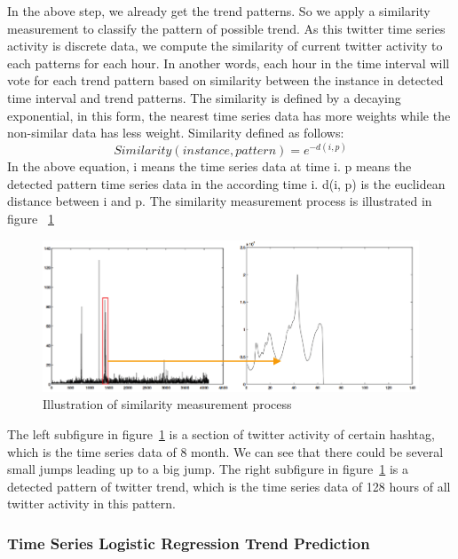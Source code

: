 \documentclass{article}
\begin{document}
In the above step, we already get the trend patterns. So we apply a similarity measurement to classify the pattern of possible trend. As this twitter time series activity is discrete data, we compute the similarity of current twitter activity to each patterns for each hour. In another words, each hour in the time interval will vote for each trend pattern based on similarity between the instance in detected time interval and trend patterns.
The similarity is defined by a decaying exponential, in this form, the nearest time series data has more weights while the non-similar data has less weight. Similarity defined as follows:
\begin{equation} 
Similarity(instance, pattern) = e^{-d(i, p)}
\end{equation}
In the above equation, i means the time series data at time i. p means the detected pattern time series data in the according time i. d(i, p) is the euclidean distance between i and p. The similarity measurement process is illustrated in figure ~\ref{imgcmp}
\begin{figure}[ht]
\vskip 0.2in
\begin{center}
\centerline{\includegraphics[width=\columnwidth]{compare}}
\caption{Illustration of similarity measurement process}
\label{imgcmp}
\end{center}
\vskip -0.2in
\end{figure} 
The left subfigure in figure~\ref{imgcmp} is a section of twitter activity of certain hashtag, which is the time series data of 8 month. We can see that there could be several small jumps leading up to a big jump. The right subfigure in figure~\ref{imgcmp} is a detected pattern of twitter trend, which is the time series data of 128 hours of all twitter activity in this pattern.  


\subsubsection{Time Series Logistic Regression Trend Prediction}
\end{document}
